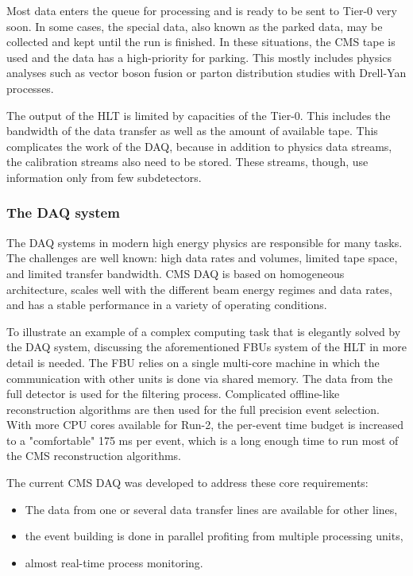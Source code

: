 \begin{normalsize}
Most data enters the queue for processing and is ready to be sent to Tier-0 very soon. In some cases, the special data, also known as the parked data, may be collected and kept until the run is finished. In these situations, the CMS tape is used and the data has a high-priority for parking. This mostly includes physics analyses such as vector boson fusion or parton distribution studies with Drell-Yan processes.

The output of the HLT is limited by capacities of the Tier-0. This includes the bandwidth of the data transfer as well as the amount of available tape. This complicates the work of the DAQ, because in addition to physics data streams, the calibration streams also need to be stored. These streams, though, use information only from few subdetectors. 



\subsubsection{The DAQ system}


The DAQ systems in modern high energy physics are responsible for many tasks. The challenges are well known: high data rates and volumes, limited tape space, and limited transfer bandwidth. CMS DAQ is based on homogeneous architecture, scales well with the different beam energy regimes and data rates, and has a stable performance in a variety of operating conditions. 

To illustrate an example of a complex computing task that is elegantly solved by the DAQ system, discussing the aforementioned FBUs system of the HLT in more detail is needed. The FBU relies on a single multi-core machine in which the communication with other units is done via shared memory. The data from the full detector is used for the filtering process. Complicated offline-like reconstruction algorithms are then used for the full precision event selection. With more CPU cores available for Run-2, the per-event time budget is increased to a "comfortable" 175 ms per event, which is a long enough time to run most of the CMS reconstruction algorithms. 

The current CMS DAQ was developed to address these core requirements: 

\begin{itemize}
\item The data from one or several data transfer lines are available for other lines,
\item the event building is done in parallel profiting from multiple processing units,
\item almost real-time process monitoring.
\end{itemize}



\end{normalsize}
